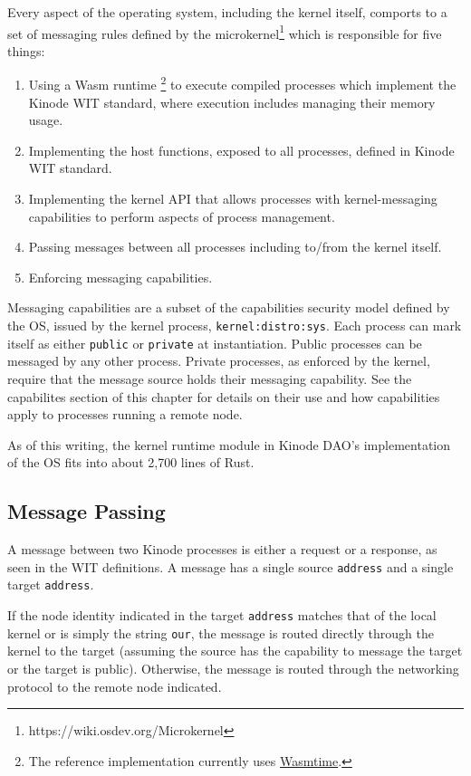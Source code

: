 \documentclass[runningheads]{llncs}
\begin{document}
Every aspect of the operating system, including the kernel itself, comports to a set of messaging rules defined by the microkernel\footnote{https://wiki.osdev.org/Microkernel} which is responsible for five things:
\begin{enumerate}
    \item Using a Wasm runtime
    \footnote{The reference implementation currently uses \href{https://wasmtime.dev}{Wasmtime}.}
    to execute compiled processes which implement the Kinode WIT standard, where execution includes managing their memory usage.
    \item Implementing the host functions, exposed to all processes, defined in Kinode WIT standard.
    \item Implementing the kernel API that allows processes with kernel-messaging capabilities to perform aspects of process management.
    \item Passing messages between all processes including to/from the kernel itself.
    \item Enforcing messaging capabilities.
\end{enumerate}

Messaging capabilities are a subset of the capabilities security model defined by the OS, issued by the kernel process, \verb|kernel:distro:sys|.
Each process can mark itself as either \verb|public| or \verb|private| at instantiation.
Public processes can be messaged by any other process.
Private processes, as enforced by the kernel, require that the message source holds their messaging capability.
See the capabilites section of this chapter for details on their use and how capabilities apply to processes running a remote node.

As of this writing, the kernel runtime module in Kinode DAO's implementation of the OS fits into about 2,700 lines of Rust.

\subsection{Message Passing}

A message between two Kinode processes is either a request or a response, as seen in the WIT definitions.
A message has a single source \verb|address| and a single target \verb|address|.

If the node identity indicated in the target \verb|address| matches that of the local kernel or is simply the string \verb|our|, the message is routed directly through the kernel to the target (assuming the source has the capability to message the target or the target is public).
Otherwise, the message is routed through the networking protocol to the remote node indicated.
\end{document}
